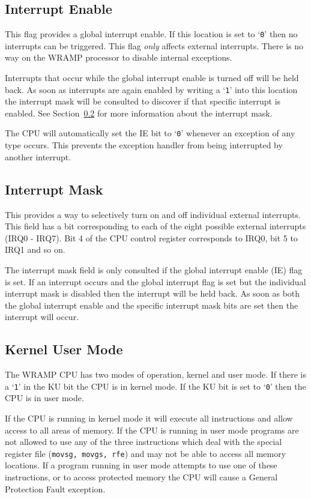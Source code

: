 \documentclass[a4paper,10pt]{article}
\begin{document}
\subsection{Interrupt Enable}

This flag provides a global interrupt enable. If this location is set
to `\texttt{0}' then no interrupts can be triggered. This flag
\emph{only} affects external interrupts. There is no way on the WRAMP
processor to disable internal exceptions.

Interrupts that occur while the global interrupt enable is turned off
will be held back. As soon as interrupts are again enabled by writing
a `\texttt{1}' into this location the interrupt mask will be consulted
to discover if that specific interrupt is enabled. See
Section~\ref{sec:imask} for more information about the interrupt mask.

The CPU will automatically set the IE bit to `\texttt{0}' whenever an
exception of any type occurs. This prevents the exception handler
from being interrupted by another interrupt.

\subsection{Interrupt Mask}
\label{sec:imask}

This provides a way to selectively turn on and off individual external
interrupts. This field has a bit corresponding to each of the eight
possible external interrupts (IRQ0 - IRQ7). Bit 4 of the CPU control
register corresponds to IRQ0, bit 5 to IRQ1 and so on.

The interrupt mask field is only consulted if the global interrupt
enable (IE) flag is set. If an interrupt occurs and the global
interrupt flag is set but the individual interrupt mask is disabled
then the interrupt will be held back. As soon as both the global
interrupt enable and the specific interrupt mask bits are set then the
interrupt will occur.

\subsection{Kernel User Mode}

The WRAMP CPU has two modes of operation, kernel and user mode. If
there is a `\texttt{1}' in the KU bit the CPU is in kernel mode. If
the KU bit is set to `\texttt{0}' then the CPU is in user mode. 

If the CPU is running in kernel mode it will execute all instructions and
allow access to all areas of memory. If the CPU is running in user
mode programs are not allowed to use any of the three instructions
which deal with the special register file (\texttt{movsg, movgs, rfe})
and may not be able to access all memory locations. If a program
running in user mode attempts to use one of these instructions, or to
access protected memory the CPU will cause a General Protection Fault
exception.
\end{document}
